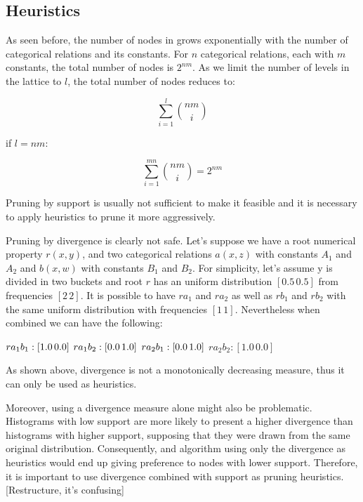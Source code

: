 \subsection{Heuristics}

As seen before, the number of nodes in \graphname grows exponentially with the number of categorical relations
and its constants. For $n$ categorical relations, each with $m$ constants, the total number of nodes is $2^{nm}$. As we
limit the number of levels in the lattice to $l$, the total number of nodes reduces to:

\begin{center}
  \begin{equation}
    \sum_{i=1}^{l}\binom{nm}{i}
  \end{equation}
\end{center}

if $l=nm$:

\begin{center}
  \begin{equation}
    \sum_{i=1}^{mn}\binom{nm}{i} = 2^{nm}
  \end{equation}
\end{center}


Pruning by support is usually not sufficient to make it feasible and it is necessary to apply
heuristics to prune it more aggressively.


Pruning by divergence is clearly not safe. Let's suppose we have a root numerical property $r(x,y)$, and two categorical
relations $a(x,z)$ with constants $A_1$ and $A_2$ and $b(x,w)$ with constants $B_1$ and $B_2$. For simplicity, let's
assume y is divided in two buckets and root $r$ has an uniform distribution $[0.5 \, 0.5]$ from frequencies $[2 \, 2]$.
It is possible to have $r a_1$ and $r a_2$ as well as $r b_1$ and $r b_2$ with the same uniform distribution with
frequencies $[1 \, 1]$. Nevertheless when combined we can have the following:

$r a_1 b_1 : [1.0 \, 0.0] \\$
$r a_1 b_2 : [0.0 \, 1.0] \\$
$r a_2 b_1 : [0.0 \, 1.0] \\$
$r a_2 b_2 : [1.0 \, 0.0]$

As shown above, divergence is not a monotonically decreasing measure, thus it can only be used as heuristics.


Moreover, using a divergence measure alone might also be problematic. Histograms with low support are more likely to
present a higher divergence than histograms with higher support, supposing that they were drawn from the same original
distribution. Consequently, and algorithm using only the divergence as heuristics would end up giving preference to
nodes with lower support. Therefore, it is important to use divergence combined with support as pruning heuristics.
[Restructure, it's confusing]

